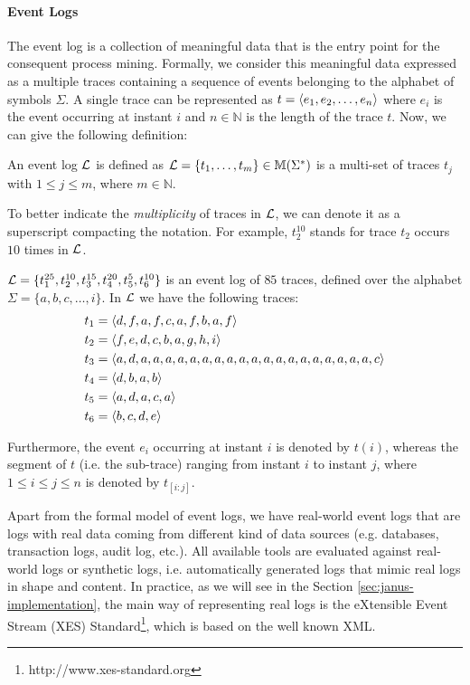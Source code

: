 \paragraph{Event Logs}
The event log is a collection of meaningful data that is the entry point for the consequent process mining. Formally, we consider this meaningful data expressed as a multiple traces containing a sequence of events belonging to the alphabet of symbols $\Sigma$. A single trace can be represented as $t = \langle e_1,e_2,\dots,e_n \rangle$ where $e_i$ is the event occurring at instant $i$ and $n \in \mathbb{N}$ is the length of the trace $t$.  Now, we can give the following definition:
\begin{definition}
An event log $\mathcal{L}$ is defined as $\mathcal{L} = \{t_1,\dots,t_m\} \in \mathbb{M} (\Sigma^*)$ is a multi-set of traces $t_j$ with $1 \le j \le m$, where $m \in \mathbb{N}$.
\end{definition}
To better indicate the \textit{multiplicity} of traces in $\mathcal{L}$, we can denote it as a superscript compacting the notation. For example, $t_{2}^{10}$ stands for trace $t_2$ occurs $10$ times in $\mathcal{L}$.
\begin{example}\label{ex:traces}
$\mathcal{L} = \{t_{1}^{25},t_{2}^{10},t_{3}^{15},t_{4}^{20},t_{5}^{5},t_{6}^{10}\}$ is an event log of $85$ traces, defined over the alphabet $\Sigma = \{a,b,c,\dots, i \} $. In $ \mathcal{L} $ we have the following traces:
\begin{align*}
t_1 &= \langle d,f,a,f,c,a,f,b,a,f \rangle\\
t_2 &= \langle f,e,d,c,b,a,g,h,i \rangle\\
t_3 &= \langle a,d,a,a,a,a,a,a,a,a,a,a,a,a,a,a,a,a,a,a,a,c \rangle\\
t_4 &= \langle d,b,a,b \rangle\\
t_5 &= \langle a,d,a,c,a \rangle\\
t_6 &= \langle b,c,d,e \rangle
\end{align*}
\end{example}
Furthermore, the event $e_i$ occurring at instant $i$ is denoted by $t(i)$, whereas the segment of $t$ (i.e. the sub-trace) ranging from instant $i$ to instant $j$, where $1 \le i \le j \le n$ is denoted by $t_{[i:j]}$.

Apart from the formal model of event logs, we have real-world event logs that are logs with real data coming from different kind of data sources (e.g. databases, transaction logs, audit log, etc.). All available tools are evaluated against real-world logs or synthetic logs, i.e. automatically generated logs that mimic real logs in shape and content. In practice, as we will see in the Section \ref{sec:janus-implementation}, the main way of representing real logs is the eXtensible Event Stream (XES) Standard\footnote{http://www.xes-standard.org}, which is based on the well known XML.
